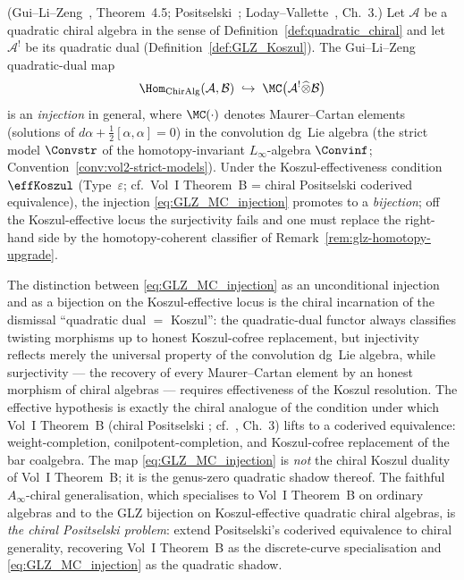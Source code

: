 \begin{theorem}
\label{thm:GLZ_MC}
(Gui--Li--Zeng~\cite{GLZ22}, Theorem~4.5; Positselski~\cite{Positselski11}; Loday--Vallette~\cite{LV12}, Ch.~3.)
Let $\mathcal{A}$ be a quadratic chiral algebra in the sense of
Definition~\ref{def:quadratic_chiral} and let $\mathcal{A}^!$ be its
quadratic dual (Definition~\ref{def:GLZ_Koszul}). The
Gui--Li--Zeng quadratic-dual map
\begin{equation}
\label{eq:GLZ_MC_injection}
\Hom_{\mathrm{ChirAlg}}(\mathcal{A}, \mathcal{B})
 \;\hookrightarrow\;
 \MC\bigl(\mathcal{A}^! \widehat{\otimes} \mathcal{B}\bigr)
\end{equation}
is an \emph{injection} in general, where $\MC(\cdot)$ denotes
Maurer--Cartan elements (solutions of
$d\alpha + \tfrac{1}{2}[\alpha,\alpha] = 0$) in the convolution
dg~Lie algebra (the strict model $\Convstr$ of the
homotopy-invariant $L_\infty$-algebra $\Convinf$; Convention~\ref{conv:vol2-strict-models}). Under the Koszul-effectiveness condition $\effKoszul$ (Type~$\varepsilon$; cf.\ Vol~I Theorem~B = chiral Positselski coderived
equivalence), the injection \eqref{eq:GLZ_MC_injection} promotes to
a \emph{bijection}; off the Koszul-effective locus the surjectivity
fails and one must replace the right-hand side by the homotopy-coherent
classifier of Remark~\ref{rem:glz-homotopy-upgrade}.
\end{theorem}

\begin{remark}
\label{rem:GLZ_MC_eff_caveat}
The distinction between \eqref{eq:GLZ_MC_injection} as an
unconditional injection and as a bijection on the Koszul-effective
locus is the chiral incarnation of the dismissal
``quadratic dual $=$ Koszul'': the quadratic-dual functor always
classifies twisting morphisms up to honest Koszul-cofree
replacement, but injectivity reflects merely the universal property
of the convolution dg~Lie algebra, while surjectivity --- the
recovery of every Maurer--Cartan element by an honest morphism of
chiral algebras --- requires effectiveness of the Koszul resolution.
The effective hypothesis is exactly the chiral analogue of the
condition under which Vol~I Theorem~B (chiral Positselski
\cite{Positselski11}; cf.\ \cite{LV12}, Ch.~3) lifts to a coderived
equivalence: weight-completion, conilpotent-completion, and
Koszul-cofree replacement of the bar coalgebra. The map
\eqref{eq:GLZ_MC_injection} is \emph{not} the chiral Koszul duality
of Vol~I Theorem~B; it is the genus-zero quadratic shadow thereof.
The faithful $A_\infty$-chiral generalisation, which
specialises to Vol~I Theorem~B on ordinary algebras and to the
GLZ bijection on Koszul-effective quadratic chiral algebras, is
\emph{the chiral Positselski problem}: extend Positselski's
coderived equivalence to chiral generality,
recovering Vol~I Theorem~B as the discrete-curve specialisation
and \eqref{eq:GLZ_MC_injection} as the quadratic shadow.
\end{remark}

